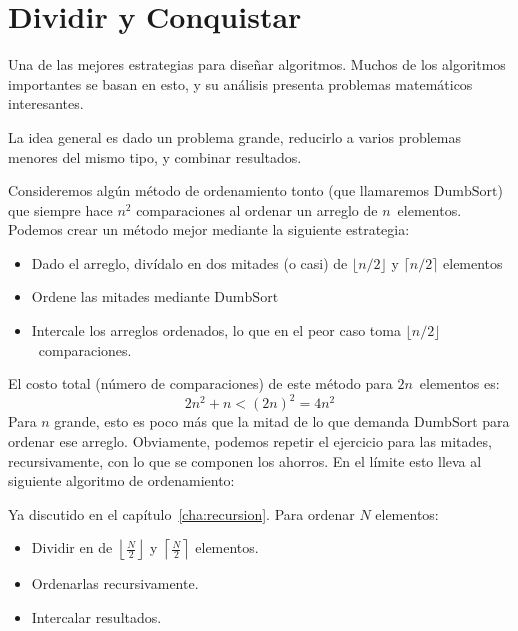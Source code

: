 

\chapter{Dividir y Conquistar}
\label{cha:dividir-conquistar}

  Una de las mejores estrategias para diseñar algoritmos.
  Muchos de los algoritmos importantes se basan en esto,
  y su análisis presenta problemas matemáticos interesantes.

  La idea general es
  dado un problema grande,
  reducirlo a varios problemas menores del mismo tipo,
  y combinar resultados.

  Consideremos algún método de ordenamiento tonto
  (que llamaremos \(\mathrm{DumbSort}\))
  que siempre hace \(n^2\) comparaciones al ordenar
  un arreglo de \(n\)~elementos.
  Podemos crear un método mejor mediante la siguiente estrategia:
  \begin{itemize}
  \item
    Dado el arreglo, divídalo en dos mitades
    (o casi)
    de \(\lfloor n / 2 \rfloor\) y \(\lceil n / 2 \rceil\) elementos
  \item
    Ordene las mitades mediante \(\mathrm{DumbSort}\)
  \item
    Intercale los arreglos ordenados,
    lo que en el peor caso toma \(\lfloor n / 2 \rfloor\)~comparaciones.
  \end{itemize}
  El costo total
  (número de comparaciones)
  de este método para \(2 n\)~elementos es:
  \begin{equation*}
    2 n^2 + n
     < (2 n)^2
     = 4 n^2
  \end{equation*}
  Para \(n\) grande,
  esto es poco más que la mitad de lo que demanda \(\mathrm{DumbSort}\)
  para ordenar ese arreglo.
  Obviamente,
  podemos repetir el ejercicio para las mitades,
  recursivamente,
  con lo que se componen los ahorros.
  En el límite esto lleva al siguiente algoritmo de ordenamiento:
  \begin{example}
    Ya discutido en el capítulo~\ref{cha:recursion}.
    Para ordenar \(N\) elementos:
    \begin{itemize}
    \item
      Dividir en 
      de \(\left\lfloor \frac{N}{2} \right\rfloor\)
      y \(\left\lceil \frac{N}{2}\right\rceil\) elementos.
    \item
      Ordenarlas recursivamente.
    \item
      Intercalar resultados.
    \end{itemize}
  \end{example}
